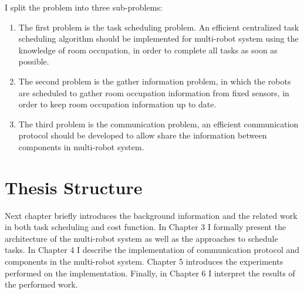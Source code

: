 I split the problem into three sub-problems:
\begin{enumerate}
    \item The first problem is the task scheduling problem. An efficient centralized task scheduling algorithm should be implemented for multi-robot system using the knowledge of room occupation, in order to complete all tasks as soon as possible. 
    \item The second problem is the gather information problem, in which the robots are scheduled to gather room occupation information from fixed sensors, in order to keep room occupation information up to date.
    \item The third problem is the communication problem, an efficient communication protocol should be developed to allow share the information between components in multi-robot system.
\end{enumerate}




\section{Thesis Structure}
Next chapter briefly introduces the background information and the related work in both task scheduling and cost function.
In Chapter 3 I formally present the architecture of the multi-robot system as well as the approaches to schedule tasks. 
In Chapter 4 I describe the implementation of communication protocol and components in the multi-robot system.
Chapter 5 introduces the experiments performed on the implementation. 
Finally, in Chapter 6 I interpret the results of the performed work.